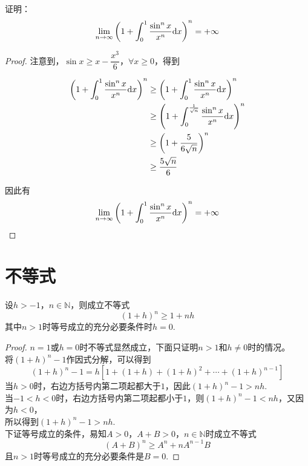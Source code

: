 \begin{proposition}

    证明：
    $$\lim\limits_{n \to \infty}{\left( 1 + \int_{0}^{1}{\dfrac{\sin^n{x}}{x^n}}\mathrm{d} x \right)^n} = + \infty$$

\end{proposition}

\begin{proof}

    注意到，$\sin{x} \geq x - \dfrac{x^3}{6}$，$\forall x \geq 0$，得到

    \begin{align*}
        \left( 1 + \int_{0}^{1}{\dfrac{\sin^n{x}}{x^n}}\mathrm{d} x \right)^n & \geq \left( 1 + \int_{0}^{1}{\dfrac{\sin^n x}{x^n}}\mathrm{d} x \right)^n \\
        & \geq \left( 1 + \int_{0}^{\frac{1}{\sqrt{n}}}{\dfrac{\sin^n{x}}{x^n}}\mathrm{d} x \right)^n \\
        & \geq \left(1 + \dfrac{5}{6\sqrt{n}}\right)^n \\
        & \geq \dfrac{5\sqrt{n}}{6}
    \end{align*}

    因此有
    $$\lim\limits_{n \to \infty}{\left( 1 + \int_{0}^{1}{\dfrac{\sin^n{x}}{x^n}}\mathrm{d} x \right)^n} = + \infty$$

\end{proof}

\section{不等式}

\begin{theorem}[Bernoulli不等式]

    设$h>-1$，$n\in\mathbb{N}$，则成立不等式
    $$(1+h)^n\geq1+nh$$
    其中$n>1$时等号成立的充分必要条件时$h=0$.

\end{theorem}

\begin{proof}
    
    $n=1$或$h=0$时不等式显然成立，下面只证明$n>1$和$h\neq 0$时的情况。\\
    将$(1+h)^n-1$作因式分解，可以得到
    $$(1+h)^n-1=h[1+(1+h)+(1+h)^2+\cdots+(1+h)^{n-1}]$$
    当$h>0$时，右边方括号内第二项起都大于$1$，因此$(1+h)^n-1>nh$.\\
    当$-1<h<0$时，右边方括号内第二项起都小于$1$，则$(1+h)^n-1<nh$，又因为$h<0$，\\
    所以得到$(1+h)^n-1>nh$.\\
    下证等号成立的条件，易知$A>0$，$A+B>0$，$n\in\mathbb{N}$时成立不等式
    $$(A+B)^n\geq A^n + nA^{n-1}B$$
    且$n>1$时等号成立的充分必要条件是$B=0$.

\end{proof}

